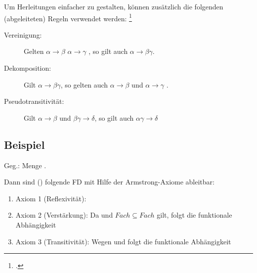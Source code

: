 \documentclass{bschlangaul-theorie}
\begin{document}
Um Herleitungen einfacher zu gestalten, können zusätzlich die folgenden
(abgeleiteten) Regeln verwendet werden:
\footcite[Axiome von Armstrong]{wiki:funktionale-abhängigkeit}

%


\begin{description}
\item[Vereinigung:]
%
Gelten
$\alpha \rightarrow \beta$
$\alpha \rightarrow \gamma$ , so gilt auch
$\alpha \rightarrow \beta \gamma$.

\item[Dekomposition:]
%
Gilt
$\alpha \rightarrow \beta \gamma$,
so gelten auch
$\alpha \rightarrow \beta$ und
$\alpha \rightarrow \gamma$ .

\item[Pseudotransitivität:]
%
Gilt
$\alpha \rightarrow \beta$ und
$\beta \gamma \rightarrow \delta$,
so gilt auch
$\alpha \gamma \rightarrow \delta$
\end{description}

\subsection{Beispiel}

Geg.: Menge .

Dann sind (\zB) folgende FD mit Hilfe der Armstrong-Axiome
ableitbar:

\begin{enumerate}
\item Axiom 1 (Reflexivität): 

\item Axiom 2 (Verstärkung): Da  und
${Fach} \subseteq {Fach}$ gilt, folgt die funktionale Abhängigkeit

\item Axiom 3 (Transitivität): Wegen  und
 folgt die funktionale Abhängigkeit
\end{enumerate}

\literatur
\end{document}
